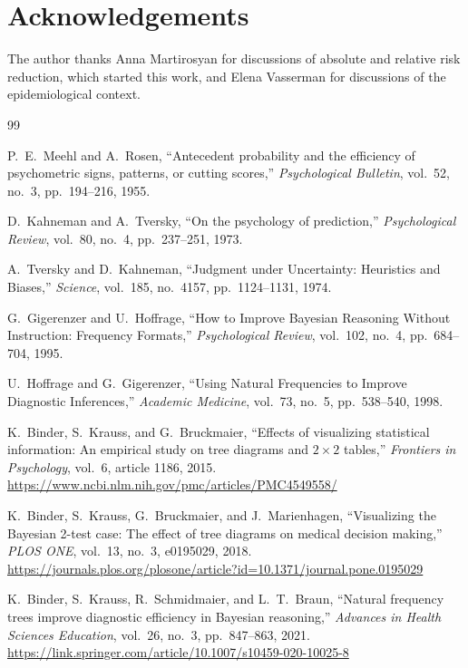 \documentclass[11pt]{article}
\begin{document}
\section*{Acknowledgements}

The author thanks Anna Martirosyan for discussions of absolute and relative risk reduction, which started this work, and Elena Vasserman for discussions of the epidemiological context.

\begin{thebibliography}{99}

P.\ E.\ Meehl and A.\ Rosen,
``Antecedent probability and the efficiency of psychometric signs, patterns, or cutting scores,''
\emph{Psychological Bulletin}, vol.\ 52, no.\ 3, pp.\ 194--216, 1955.

D.\ Kahneman and A.\ Tversky,
``On the psychology of prediction,''
\emph{Psychological Review}, vol.\ 80, no.\ 4, pp.\ 237--251, 1973.

A.\ Tversky and D.\ Kahneman,
``Judgment under Uncertainty: Heuristics and Biases,''
\emph{Science}, vol.\ 185, no.\ 4157, pp.\ 1124--1131, 1974.

G.\ Gigerenzer and U.\ Hoffrage,
``How to Improve Bayesian Reasoning Without Instruction: Frequency Formats,''
\emph{Psychological Review}, vol.\ 102, no.\ 4, pp.\ 684--704, 1995.

U.\ Hoffrage and G.\ Gigerenzer,
``Using Natural Frequencies to Improve Diagnostic Inferences,''
\emph{Academic Medicine}, vol.\ 73, no.\ 5, pp.\ 538--540, 1998.

K.\ Binder, S.\ Krauss, and G.\ Bruckmaier,
``Effects of visualizing statistical information: An empirical study on tree diagrams and $2\times 2$ tables,''
\emph{Frontiers in Psychology}, vol.\ 6, article 1186, 2015.
\url{https://www.ncbi.nlm.nih.gov/pmc/articles/PMC4549558/}

K.\ Binder, S.\ Krauss, G.\ Bruckmaier, and J.\ Marienhagen,
``Visualizing the Bayesian 2-test case: The effect of tree diagrams on medical decision making,''
\emph{PLOS ONE}, vol.\ 13, no.\ 3, e0195029, 2018.
\url{https://journals.plos.org/plosone/article?id=10.1371/journal.pone.0195029}

K.\ Binder, S.\ Krauss, R.\ Schmidmaier, and L.\ T.\ Braun,
``Natural frequency trees improve diagnostic efficiency in Bayesian reasoning,''
\emph{Advances in Health Sciences Education}, vol.\ 26, no.\ 3, pp.\ 847--863, 2021.
\url{https://link.springer.com/article/10.1007/s10459-020-10025-8}


\end{thebibliography}
\end{document}
